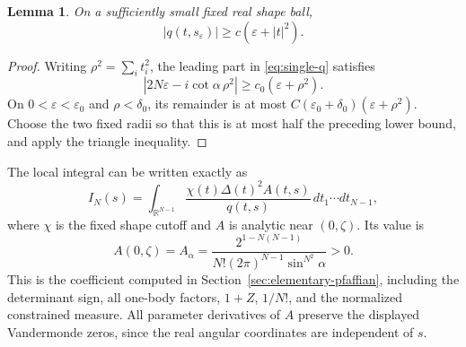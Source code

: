 \documentclass[11pt]{article}
\numberwithin{equation}{section}
\newtheorem{lemma}[theorem]{Lemma}
\theoremstyle{remark}\newtheorem{remark}[theorem]{Remark}
\begin{document}
\begin{lemma}\label{lem:single-q-bound}
On a sufficiently small fixed real shape ball,
\[
 |q(t,s_\varepsilon)|\ge c(\varepsilon+|t|^2).
\]
\end{lemma}
\begin{proof}
Writing $\rho^2=\sum_i t_i^2$, the leading part in
\eqref{eq:single-q} satisfies
\[
 |2N\varepsilon-i\cot\alpha\,\rho^2|
       \ge c_0(\varepsilon+\rho^2).
\]
On $0<\varepsilon<\varepsilon_0$ and $\rho<\delta_0$, its
remainder is at most
$C(\varepsilon_0+\delta_0)(\varepsilon+\rho^2)$.
Choose the two fixed radii so that this is at most half the
preceding lower bound, and apply the triangle inequality.
\end{proof}

The local integral can be written exactly as
\begin{equation}\label{eq:angular-local-integral}
 I_N(s)=\int_{\mathbb R^{N-1}}
        \frac{\chi(t)\Delta(t)^2 A(t,s)}{q(t,s)}
                    \,dt_1\cdots dt_{N-1},
\end{equation}
where $\chi$ is the fixed shape cutoff and $A$ is analytic
near $(0,\zeta)$.  Its value is
\begin{equation}\label{eq:angular-local-prefactor}
 A(0,\zeta)=A_\alpha
 =\frac{2^{1-N(N-1)}}{N!(2\pi)^{N-1}\sin^{N^2}\alpha}>0.
\end{equation}
This is the coefficient computed in
Section~\ref{sec:elementary-pfaffian}, including
the determinant sign, all one-body factors, $1+Z$, $1/N!$,
and the normalized constrained measure.
All parameter derivatives of $A$ preserve the displayed
Vandermonde zeros, since the real angular coordinates are
independent of $s$.
\end{document}

